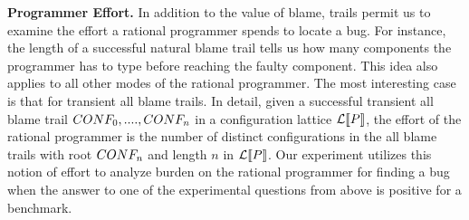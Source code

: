 \noindent
{\bf Programmer Effort.} In addition to the value of blame, trails permit
us to examine the effort a rational programmer spends to locate a bug. 
For instance, the length of a successful natural blame trail tells us how
many components the programmer has to type before reaching the faulty
component. This idea also applies to all other modes of the rational
programmer. The most interesting case is that for transient all blame trails. 
In detail, given a successful transient all blame trail 
$CONF_0, ...., CONF_n$ in a configuration lattice $\mathcal{L}\llbracket P\rrbracket$,  
the effort of the rational programmer is the 
number of distinct configurations in the all blame trails with root $CONF_n$ and 
length $n$ in $\mathcal{L}\llbracket P\rrbracket$. Our experiment utilizes this notion of
effort to analyze burden on the rational programmer for finding a
bug when the answer to one of the experimental questions from above is
positive for a benchmark. 


























































































































